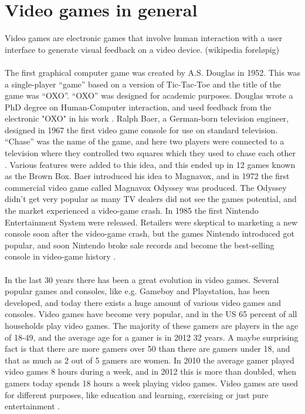 \section{Video games in general}
Video games are electronic games that involve human interaction with a user interface to generate visual feedback on a video device. (wikipedia foreløpig)\\ \\
The first graphical computer game was created by A.S. Douglas in 1952. This was a single-player “game” based on a version of Tic-Tac-Toe and the title of the game was “OXO”. “OXO” was designed for academic purposes.  Douglas wrote a PhD degree on Human-Computer interaction, and used feedback from the electronic "OXO" in his work \cite{abouthiginbotham}. Ralph Baer, a German-born television engineer, designed in 1967 the first video game console for use on standard television. “Chase” was the name of the game, and here two players were connected to a television where they controlled two squares which they used to chase each other \cite{videogameHistory}. Various features were added to this idea, and this ended up in 12 games known as the Brown Box. Baer introduced his idea to Magnavox, and in 1972 the first commercial video game called Magnavox Odyssey was produced. The Odyssey didn’t get very popular as many TV dealers did not see the games potential, and the market experienced a video-game crash.  In 1985 the first Nintendo Entertainment System were released. Retailers were skeptical to marketing a new console soon after the video-game crash, but the games Nintendo introduced got popular, and soon Nintendo broke sale records and become the best-selling console in video-game history \cite{consoleHistory}. \\ \\
In the last 30 years there has been a great evolution in video games. Several popular games and consoles, like e.g. Gameboy and Playstation, has been developed, and today there exists a huge amount of various video games and consoles. Video games have become very popular, and in the US 65 percent of all households play video games. The majority of these gamers are players in the age of 18-49, and the average age for a gamer is in 2012 32 years. A maybe surprising fact is that there are more gamers over 50 than there are gamers under 18, and that as much as 2 out of 5 gamers are women. In 2010 the average gamer played video games 8 hours during a week, and in 2012 this is more than doubled, when gamers today spends 18 hours a week playing video games.  Video games are used for different purposes, like education and learning, exercising or just pure entertainment \cite{statistics2010} \cite{statistics2012}. \\ \\
